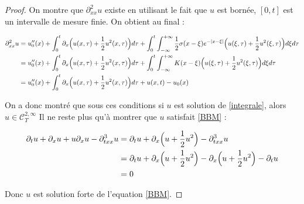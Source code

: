 \begin{proof}
    On montre que $\partial_{xx}^2 u$ existe en utilisant le fait que $u$ est bornée, $[0,t]$ est un intervalle de mesure finie. On obtient au final :

    \begin{equation*}
    \begin{split}
        \partial_{xx}^2 u &= u_0''(x) + \int_{0}^{t} \partial_x \Bigl( u(x,\tau) + \frac{1}{2} u^2(x,\tau) \Bigr) d\tau  + \int_{0}^{t} \int_{-\infty}^{+\infty} \frac{1}{2} \sigma(x-\xi) e^{-|x - \xi|} \Bigl( u(\xi,\tau) + \frac{1}{2}u^2(\xi,\tau) \Bigr) d\xi d\tau \\
        &= u_0''(x) + \int_{0}^{t} \partial_x \Bigl( u(x,\tau) + \frac{1}{2} u^2(x,\tau) \Bigr) d\tau + \int_{0}^{t} \int_{-\infty}^{+\infty} K(x - \xi) \Bigl( u(\xi,\tau) + \frac{1}{2}u^2(\xi,\tau) \Bigr) d\xi d\tau \\
        &= u_0''(x) + \int_{0}^{t} \partial_x \Bigl( u(x,\tau) + \frac{1}{2} u^2(x,\tau) \Bigr) d\tau + u(x,t) - u_0(x)
    \end{split}
    \end{equation*}

    
    On a donc montré que sous ces conditions si $u$ est solution de \ref{integrale}, alors $u \in \mathcal{C}_T^{2,\infty}$
    Il ne reste plus qu'à montrer que $u$ satisfait \ref{BBM} : 

    \begin{equation*}
    \begin{split}
        \partial_t u + \partial_x u + u\partial_x u - \partial_{txx}^3u &= \partial_t u + \partial_x \Bigl(u + \frac{1}{2}u^2\Bigr) - \partial_{txx}^3u \\ 
        &=\partial_t u + \partial_x \Bigl( u + \frac{1}{2}u^2 \Bigr) - \partial_x \Bigl( u + \frac{1}{2}u^2 \Bigr) - \partial_t u \\
        &= 0
    \end{split}
    \end{equation*}

    Donc $u$ est solution forte de l'equation \ref{BBM}.

\end{proof}


